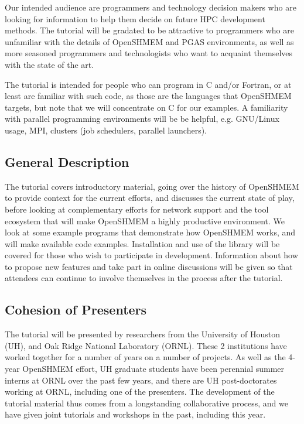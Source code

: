 \documentclass[10pt,english]{article}
\begin{document}
Our intended audience are programmers and technology decision makers
who are looking for information to help them decide on future HPC
development methods.  The tutorial will be gradated to be attractive
to programmers who are unfamiliar with the details of OpenSHMEM and
PGAS environments, as well as more seasoned programmers and
technologists who want to acquaint themselves with the state of the
art.

The tutorial is intended for people who can program in C and/or
Fortran, or at least are familiar with such code, as those are the
languages that OpenSHMEM targets, but note that we will concentrate on
C for our examples.  A familiarity with parallel programming
environments will be be helpful, e.g. GNU/Linux usage, MPI, clusters
(job schedulers, parallel launchers).

\subsection{General Description}

The tutorial covers introductory material, going over the history of
OpenSHMEM to provide context for the current efforts, and discusses
the current state of play, before looking at complementary efforts for
network support and the tool ecosystem that will make OpenSHMEM a
highly productive environment.  We look at some example programs that
demonstrate how OpenSHMEM works, and will make available code
examples.  Installation and use of the library will be covered for
those who wish to participate in development.  Information about how
to propose new features and take part in online discussions will be
given so that attendees can continue to involve themselves in the
process after the tutorial.

\subsection{Cohesion of Presenters}

The tutorial will be presented by researchers from the University of
Houston (UH), and Oak Ridge National Laboratory (ORNL).  These 2
institutions have worked together for a number of years on a number of
projects.  As well as the 4-year OpenSHMEM effort, UH graduate
students have been perennial summer interns at ORNL over the past few
years, and there are UH post-doctorates working at ORNL, including one
of the presenters.  The development of the tutorial material thus
comes from a longstanding collaborative process, and we have given
joint tutorials and workshops in the past, including this year.
\end{document}
